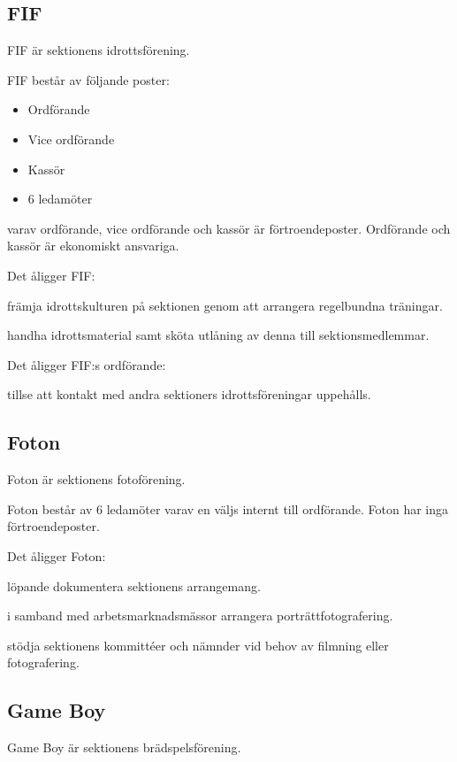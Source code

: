 \documentclass{styrdokument}
\begin{document}
\subsection{FIF}
\? FIF är sektionens idrottsförening.

\? FIF består av följande poster:
\begin{itemize}
    \item Ordförande
	\item Vice ordförande
	\item Kassör
	\item 6 ledamöter
\end{itemize}
varav ordförande, vice ordförande och kassör är förtroendeposter.
Ordförande och kassör är ekonomiskt ansvariga.

\? Det åligger FIF:
\begin{aligganden}
    \item främja idrottskulturen på sektionen genom att arrangera regelbundna träningar.
    \item handha idrottsmaterial samt sköta utlåning av denna till sektionsmedlemmar.
\end{aligganden}

\? Det åligger FIF:s ordförande:
\begin{aligganden}
      \item tillse att kontakt med andra sektioners idrottsföreningar uppehålls.
\end{aligganden}

\subsection{Foton}
\? Foton är sektionens fotoförening.

\? Foton består av 6 ledamöter varav en väljs internt till ordförande. Foton har inga förtroendeposter.
		
\? Det åligger Foton:
\begin{aligganden}
    \item löpande dokumentera sektionens arrangemang.
    \item i samband med arbetsmarknadsmässor arrangera porträttfotografering.
    \item stödja sektionens kommittéer och nämnder vid behov av filmning eller fotografering.
\end{aligganden}
	
\subsection{Game Boy}
\? Game Boy är sektionens brädspelsförening.
\end{document}
